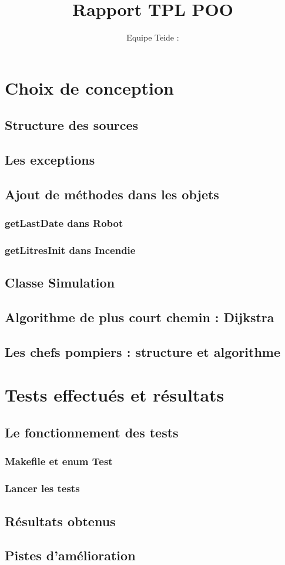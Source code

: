 \documentclass[a4paper,8pt]{article} %
\title{Rapport TPL POO}
\author{Equipe Teide : }
\date{} %
\begin{document}
\maketitle
\section{Choix de conception}
\subsection{Structure des sources} %
\subsection{Les exceptions}
\subsection{Ajout de méthodes dans les objets}
\subsubsection{getLastDate dans Robot}
\subsubsection{getLitresInit dans Incendie}
\subsection{Classe Simulation}
\subsection{Algorithme de plus court chemin : Dijkstra}
\subsection{Les chefs pompiers : structure et algorithme}
\section{Tests effectués et résultats}
\subsection{Le fonctionnement des tests}
\subsubsection{Makefile et enum Test}
\subsubsection{Lancer les tests}
\subsection{Résultats obtenus}
\subsection{Pistes d'amélioration}
\end{document}

